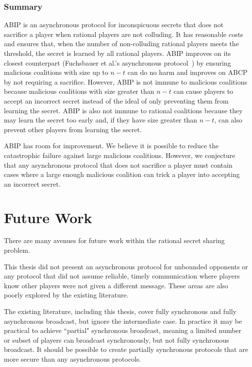 \documentclass[12pt]{dalcsthesis}
\begin{document}
\subsection{Summary}

ABIP is an asynchronous protocol for inconspicuous secrets that does not sacrifice a player when rational players are not colluding. It has reasonable costs and ensures that, when the number of non-colluding rational players meets the threshold, the secret is learned by all rational players. ABIP improves on its closest counterpart (Fuchsbauer et al.'s asynchronous protocol~\cite{fuch10}) by ensuring malicious coalitions with size up to $n-t$ can do no harm and improves on ABCP by not requiring a sacrifice. However, ABIP is not immune to malicious coalitions because malicious coalitions with size greater than $n-t$ can cause players to accept an incorrect secret instead of the ideal of only preventing them from learning the secret. ABIP is also not immune to rational coalitions because they may learn the secret too early and, if they have size greater than $n-t$, can also prevent other players from learning the secret.

ABIP has room for improvement. We believe it is possible to reduce the catastrophic failure against large malicious coalitions. However, we conjecture that any asynchronous protocol that does not sacrifice a player must contain cases where a large enough malicious coalition can trick a player into accepting an incorrect secret.



\chapter{Future Work}
\label{chapter:Future}

There are many avenues for future work within the rational secret sharing problem.

This thesis did not present an asynchronous protocol for unbounded opponents or any protocol that did not assume reliable, timely communication where players know other players were not given a different message. These areas are also poorly explored by the existing literature.

The existing literature, including this thesis, cover fully synchronous and fully asynchronous broadcast, but ignore the intermediate case. In practice it may be practical to achieve ``partial" synchronous broadcast, meaning a limited number or subset of players can broadcast synchronously, but not fully synchronous broadcast. It should be possible to create partially synchronous protocols that are more secure than any asynchronous protocols.
\end{document}
